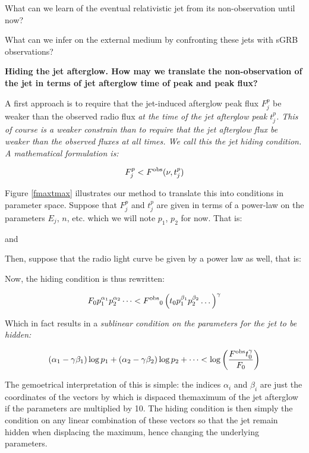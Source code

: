 What can we learn of the eventual relativistic jet from its non-observation until now?

What can we infer on the external medium by confronting these jets with sGRB observations?


\bf{Hiding the jet afterglow.} How may we translate the non-observation of the jet in terms of jet afterglow time of peak and peak flux?

A first approach is to require that the jet-induced afterglow peak flux $F_j^p$ be weaker than the observed radio flux \it{at the time of the jet afterglow peak} $t_j^p$. This of course is a weaker constrain than to require that the jet afterglow flux be \it{weaker than the observed fluxes at all times}. We call this the \it{jet hiding} condition. A mathematical formulation is:

$$F_j^p < F^{\rm{obs}}(\nu, t_j^p) $$

Figure \ref{fmaxtmax} illustrates our method to translate this into conditions in parameter space. Suppose that $F_j^p$ and $t_j^p$ are given in terms of a power-law on the parameters $E_j$, $n$, etc. which we will note $p_1$, $p_2$ for now. That is:


and 


Then, suppose that the radio light curve be given by a power law as well, that is:

\cen{$\Fobs(\nu, \tobs) = \Fobs_0 \tobs^{\gamma}$}

Now, the hiding condition is thus rewritten:

$$F_0 p_1^{\alpha_1} p_2^{\alpha_2} \dots < \Fobs_0 \left( t_0 p_1^{\beta_1} p_2^{\beta_2} \dots \right)^{\gamma} $$

Which in fact results in a \it{sublinear condition} on the parameters for the jet to be hidden:

$$(\alpha_1 - \gamma \beta_1) \log p_1 + (\alpha_2 - \gamma \beta_2) \log p_2 + \dots < \log \left( \frac{\Fobs t_0 ^\gamma}{F_0} \right) $$

The gemoetrical interpretation of this is simple: the indices $\alpha_i$ and $\beta_i$ are just the coordinates of the vectors by which is dispaced themaximum of the jet afterglow if the parameters are multiplied by 10. The hiding condition is then simply the condition on any linear combination of these vectors so that the jet remain hidden when displacing the maximum, hence changing the underlying parameters.

